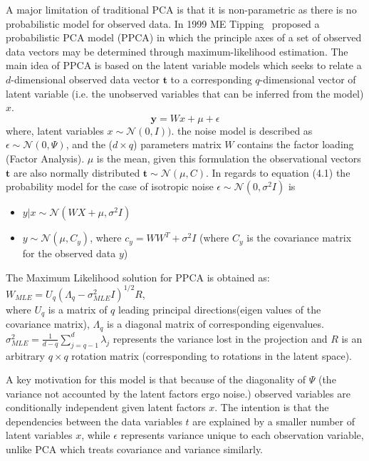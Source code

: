 \documentclass[authoryear,preprint,revi	ew,12pt]{elsarticle}
\begin{document}
 A major limitation of traditional PCA is that it is non-parametric as there is no probabilistic model for observed data. In 1999 ME Tipping~\citep*{tipping1999mixtures} proposed a probabilistic PCA model (PPCA) in which the principle axes of a set of observed data vectors may be determined through maximum-likelihood estimation. The main idea of PPCA is based on the latent variable models which seeks to relate a $ d $-dimensional observed data vector $ \mathbf{t} $ to a corresponding $ q $-dimensional vector of latent variable (i.e. the unobserved variables that can be inferred from the model) $ x $.
\begin{equation}
\mathbf{y} = Wx + \mu + \epsilon
\end{equation} 
where, latent variables $ x \sim \mathcal{N}(0,I)) $. the noise model is described as $ \epsilon \sim \mathcal{N}(0,\Psi) $, and the ($ d \times q $) parameters matrix $ W $ contains the factor loading (Factor Analysis). $ \mu $ is the mean, given this formulation the observational vectors $ \mathbf{t} $ are also normally distributed $ \mathbf{t} \sim \mathcal{N}(\mu,C) $. In regards to equation (4.1) the probability model for the case of isotropic noise $ \epsilon \sim \mathcal{N}(0,\sigma^2I) $ is 
\begin{itemize}
	\item $ y|x \sim \mathcal{N}(WX + \mu, \sigma^2I) $
	\item $ y \sim \mathcal{N}(\mu, C_y) $, where $ c_y = WW^T + \sigma^2I $ (where $C_y$ is the covariance matrix for the observed data $ y $)
\end{itemize}
The Maximum Likelihood solution for PPCA is obtained as: \\$W_{MLE} = U_q(\Lambda_q - \sigma_{MLE}^2I)^{1/2}R$, \\where $U_q$ is a matrix of $q$ leading principal directions(eigen values of the covariance matrix), $\Lambda_q$ is a diagonal matrix of corresponding eigenvalues. \\$\sigma_{MLE}^2 = \frac{1}{d-q}\sum_{j=q-1}^{d}\lambda_j$ represents the variance lost in the projection and $R$ is an arbitrary $q\times q$ rotation matrix (corresponding to rotations in the latent space). 

A key motivation for this model is that because of the diagonality of $ \Psi $ (the variance not accounted by the latent factors ergo noise.) observed variables are conditionally independent given latent factors $ x $. The intention is that the dependencies between the data variables $t$ are explained by a smaller number of latent variables $x$, while $ \epsilon $ 
represents variance unique to
each observation variable, unlike PCA which treats covariance and variance similarly. 
\end{document}
